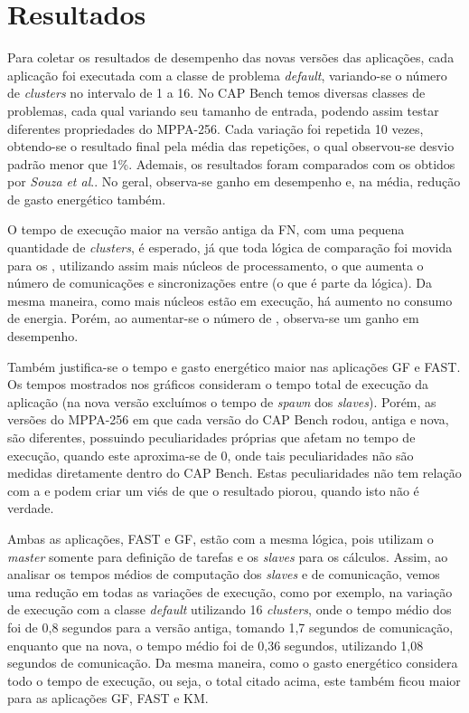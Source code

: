 \documentclass[a4paper,11pt]{article}
\newcommand{\etal}{\textit{et al}.\xspace}
\newcommand{\mppa}{MPPA-256\xspace}
\newcommand{\capb}{CAP Bench\xspace}
\begin{document}
\section{Resultados}
\label{sec:resultados}

Para coletar os resultados de desempenho das novas versões das aplicações, cada aplicação foi executada com a classe de problema \textit{default}, variando-se o número de \textit{clusters} no intervalo de 1 a 16. No \capb temos diversas classes de problemas, cada qual variando seu tamanho de entrada, podendo assim testar diferentes propriedades do \mppa. Cada variação foi repetida 10 vezes, obtendo-se o resultado final pela média das repetições, o qual observou-se desvio padrão menor que 1\%. Ademais, os resultados foram comparados com os obtidos por \textit{Souza} \etal \cite{Castro-Souza-CCPE:2016}. No geral, observa-se ganho em desempenho e, na média, redução de gasto energético também. 

O tempo de execução maior na versão antiga da FN, com uma pequena quantidade de \textit{clusters}, é esperado, já que toda lógica de comparação foi movida para os \ccs, utilizando assim mais núcleos de processamento, o que aumenta o número de comunicações e sincronizações entre \ccs (o que é parte da lógica). Da mesma maneira, como mais núcleos estão em execução, há aumento no consumo de energia. Porém, ao aumentar-se o número de \ccs, observa-se um ganho em desempenho. 

Também justifica-se o tempo e gasto energético maior nas aplicações GF e FAST. Os tempos mostrados nos gráficos consideram o tempo total de execução da aplicação (na nova versão excluímos o tempo de \textit{spawn} dos \textit{slaves}). Porém, as versões do \mppa em que cada versão do \capb rodou, antiga e nova, são diferentes, possuindo peculiaridades próprias que afetam no tempo de execução, quando este aproxima-se de 0, onde tais peculiaridades não são medidas diretamente dentro do \capb. Estas peculiaridades não tem relação com a \async e podem criar um viés de que o resultado piorou, quando isto não é verdade.

Ambas as aplicações, FAST e GF, estão com a mesma lógica, pois utilizam o \textit{master} somente para definição de tarefas e os \textit{slaves} para os cálculos. Assim, ao analisar os tempos médios de computação dos \textit{slaves} e de comunicação, vemos uma redução em todas as variações de execução, como por exemplo, na variação de execução com a classe \textit{default} utilizando 16 \textit{clusters}, onde o tempo médio dos \ccs foi de 0,8 segundos para a versão antiga, tomando 1,7 segundos de comunicação, enquanto que na nova, o tempo médio foi de 0,36 segundos, utilizando 1,08 segundos de comunicação. Da mesma maneira, como o gasto energético considera todo o tempo de execução, ou seja, o total citado acima, este também ficou maior para as aplicações GF, FAST e KM.
\end{document}
